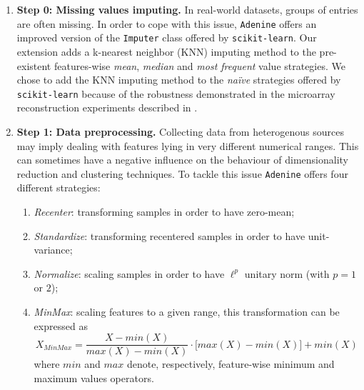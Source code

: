 \documentclass[twoside,11pt]{article}
\makeatletter
\newcommand{\ade}{\texttt{Adenine}\@\xspace}
\makeatother
\begin{document}


\begin{enumerate}
  \item[]{\bf Step 0: Missing values imputing.}
  In real-world datasets, groups of entries are often missing. In order to cope with this issue, \ade offers an improved version of the \texttt{Imputer} class offered by \texttt{scikit-learn}. Our extension adds a k-nearest neighbor (KNN) imputing method to the pre-existent features-wise \emph{mean}, \emph{median} and \emph{most frequent} value strategies.
  We chose to add the KNN imputing method to the \emph{na\"ive} strategies offered by \texttt{scikit-learn} because of the robustness demonstrated in the microarray reconstruction experiments described in \citep{troyanskaya2001missing}.

  \item[]{\bf Step 1: Data preprocessing.}
  Collecting data from heterogenous sources may imply dealing with features lying in very different numerical ranges. This can sometimes have a negative influence on the behaviour of dimensionality reduction and clustering techniques. To tackle this issue \ade offers four different strategies:
  \begin{enumerate}[label=(\roman*)]
    \item \emph{Recenter}: transforming samples in order to have zero-mean;
    \item \emph{Standardize}: transforming recentered samples in order to have unit-variance;
    \item \emph{Normalize}: scaling samples in order to have $\ell^p$ unitary norm (with $p = 1$ or $2$);
    \item \emph{MinMax}: scaling features to a given range, this transformation can be expressed as
    \[
      X_{MinMax} = \frac{X - min(X)}{max(X) - min(X)} \cdot \Big[max(X) - min(X)\Big] + min(X)
    \]
    where $min$ and $max$ denote, respectively, feature-wise minimum and maximum values operators.
  \end{enumerate}


\end{enumerate}
\end{document}
